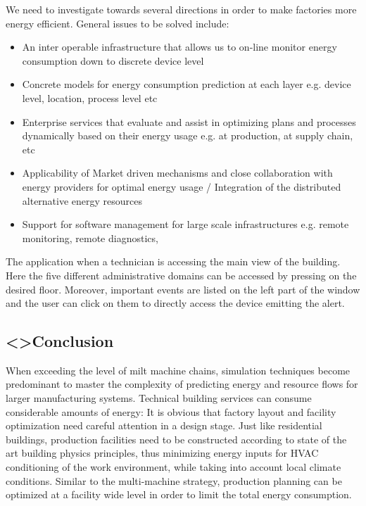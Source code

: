 We need to investigate towards several directions in order to make factories more energy efficient. General issues to be solved include:

\begin{itemize}  
\item An inter operable infrastructure that allows us to on-line monitor energy consumption down to discrete device level
\item Concrete models for energy consumption prediction at each layer e.g. device level, location, process level etc
\item Enterprise services that evaluate and assist in optimizing plans and processes dynamically based on their energy usage e.g. at production, at supply chain, etc
\item Applicability of Market driven mechanisms and close collaboration with energy providers for optimal energy usage / Integration of the distributed alternative energy resources
\item Support for software management for large scale infrastructures e.g. remote monitoring, remote diagnostics,
\end{itemize}

The application when a technician is accessing the main view of the building. Here the five different administrative domains can be accessed by pressing on the desired floor. Moreover, important events are listed on the left part of the window and the user can click on them to directly access the device emitting the alert.

\subsection{<>Conclusion }
When exceeding the level of milt machine chains, simulation techniques become predominant to master the complexity of predicting energy and resource flows for larger manufacturing systems.
Technical building services can consume considerable amounts of energy:
It is obvious that factory layout and facility optimization need careful attention in a design stage.
Just like residential buildings, production facilities need to be constructed according to state of the art building physics principles, thus minimizing energy inputs for HVAC   conditioning of the work environment, while taking into account local climate conditions.
Similar to the multi-machine strategy, production planning can be optimized at a facility wide level in order to limit the total energy consumption.

